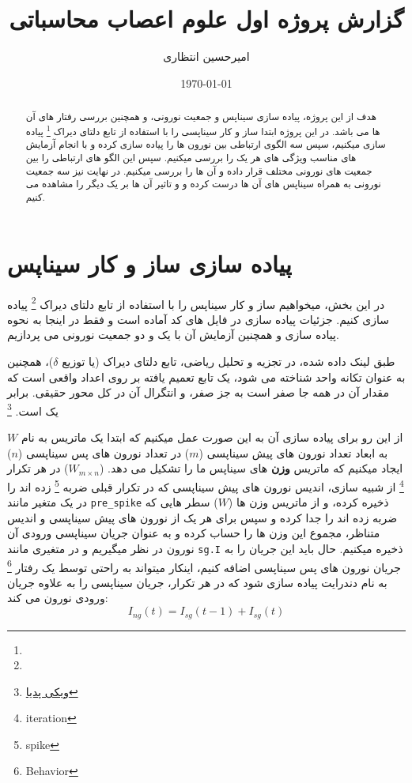 \documentclass{report}
\title{گزارش پروژه اول علوم اعصاب محاسباتی}
\author{امیرحسین انتظاری}
\date{\today}
\begin{document}
\maketitle
\newpage
\tableofcontents

    \begin{abstract}
        هدف از این پروژه، پیاده سازی سیناپس و جمعیت نورونی، و همچنین بررسی رفتار های آن ها می باشد. در این پروژه ابتدا ساز و کار سیناپسی را با استفاده از تابع دلتای دیراک 
        \footnote{}
        پیاده سازی میکنیم، سپس سه الگوی ارتباطی بین نورون ها را پیاده سازی کرده و با انجام آزمایش های مناسب ویژگی های هر یک را بررسی میکنیم. سپس این الگو های ارتباطی را بین جمعیت های نورونی مختلف قرار داده و آن ها را بررسی میکنیم. در نهایت نیز سه جمعیت نورونی به همراه سیناپس های آن ها درست کرده و و تاثیر آن ها بر یک دیگر را مشاهده می کنیم.
    \end{abstract}
\restoregeometry

\newpage
\section{پیاده سازی ساز و کار سیناپس}
    در این بخش، میخواهیم ساز و کار سیناپس را با استفاده از تابع دلتای دیراک
    \footnote{}
    پیاده سازی کنیم. جزئیات پیاده سازی در فایل های کد آماده است و فقط در اینجا به نحوه پیاده سازی و همچنین آزمایش آن با یک و دو جمعیت نورونی می پردازیم.

    طبق لینک داده شده، در تجزیه و تحلیل ریاضی، تابع دلتای دیراک
    (یا توزیع $\delta$)، 
    همچنین به عنوان تکانه واحد شناخته می شود، یک تابع تعمیم یافته بر روی اعداد واقعی است که مقدار آن در همه جا صفر است به جز صفر، و انتگرال آن در کل محور حقیقی. برابر یک است.
    \footnote{\href{https://en.wikipedia.org/wiki/Dirac\_delta\_function}{ویکی پدیا}}

    از این رو برای پیاده سازی آن به این صورت عمل میکنیم که ابتدا یک ماتریس به نام 
    $W$ 
    به ابعاد تعداد نورون های پیش سیناپسی
    ($m$)
    در تعداد نورون های پس سیناپسی
    ($n$) 
    ایجاد میکنیم که ماتریس 
    \textbf{وزن}
    های سیناپس ما را تشکیل می دهد.
    ($W_{m\times n}$)
    در هر تکرار
    \footnote{iteration}
    از شبیه سازی، اندیس نورون های پیش سیناپسی که در تکرار قبلی ضربه 
    \footnote{spike}
    زده اند را در یک متغیر مانند 
    \texttt{pre\_spike}
    ذخیره کرده، و از ماتریس وزن ها
    ($W$)
    سطر هایی که ضربه زده اند را جدا کرده و سپس برای هر یک از نورون های پیش سیناپسی و اندیس متناظر، مجموع این وزن ها را حساب کرده و به عنوان جریان سیناپسی ورودی آن نورون در نظر میگیریم و در متغیری مانند 
    \texttt{sg.I}
    ذخیره میکنیم. حال باید این جریان را به جریان نورون های پس سیناپسی اضافه کنیم، اینکار میتواند به راحتی توسط یک رفتار
    \footnote{Behavior}
    به نام دندرایت پیاده سازی شود که در هر تکرار، جریان سیناپسی را به علاوه جریان ورودی نورون می کند:
    \begin{equation}
        I_{ng}(t) = I_{sg}(t-1) + I_{sg}(t)
    \end{equation}
\end{document}
